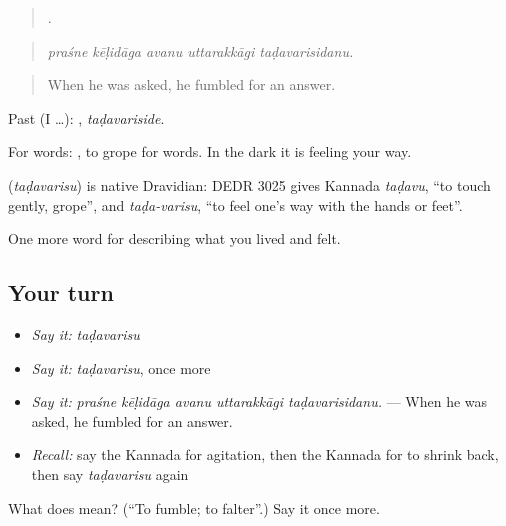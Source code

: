 \begin{quote}
    .
\end{quote}

\begin{quote}
\emph{praśne kēḷidāga avanu uttarakkāgi taḍavarisidanu.}
\end{quote}

\begin{quote}
When he was asked, he fumbled for an answer.
\end{quote}

Past (I …): , \emph{taḍavariside}.

For words:  , to grope for words. In the dark it is feeling your way.

\begin{cousinweb}
\textbf{} (\emph{taḍavarisu}) is native Dravidian: DEDR 3025 gives Kannada \emph{taḍavu}, \textquotedblleft{}to touch gently, grope\textquotedblright{}, and \emph{taḍa-varisu}, \textquotedblleft{}to feel one's way with the hands or feet\textquotedblright{}.
\end{cousinweb}

\begin{grammarlens}[title={What you've built}]
One more word for describing what you lived and felt.
\end{grammarlens}

\subsection*{Your turn}
\begin{itemize}
\raggedright
  \item \emph{Say it:} \emph{taḍavarisu}
  \item \emph{Say it:} \emph{taḍavarisu}, once more
  \item \emph{Say it:} \emph{praśne kēḷidāga avanu uttarakkāgi taḍavarisidanu.} — When he was asked, he fumbled for an answer.
  \item \emph{Recall:} say the Kannada for agitation, then the Kannada for to shrink back, then say \emph{taḍavarisu} again
\end{itemize}

\begin{tcolorbox}[breakable,colback=teal!4,colframe=teal!35!black,title={Before you move on}]
What does  mean? (\textquotedblleft{}To fumble; to falter\textquotedblright{}.) Say it once more.
\end{tcolorbox}
